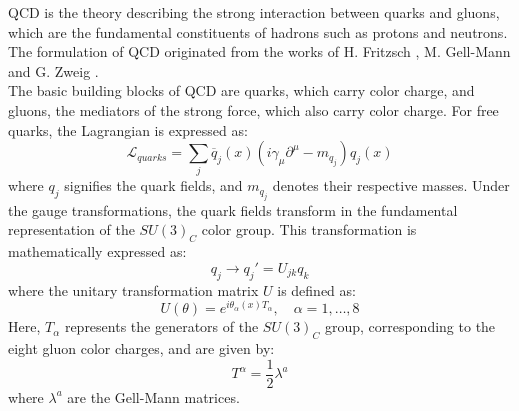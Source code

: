 \noindent QCD is the theory describing the strong interaction between quarks and gluons, which are the fundamental constituents of hadrons such as protons and neutrons. The formulation of QCD originated from the works of H. Fritzsch \cite{Fritzsch:1973pi}, M. Gell-Mann \cite{GM1, GM2} and G. Zweig \cite{Zweig:570209}.\\
The basic building blocks of QCD are quarks, which carry color charge, and gluons, the mediators of the strong force, which also carry color charge. For free quarks, the Lagrangian is expressed as:
\begin{equation}
    \mathscr{L}_{quarks} =\sum_j \overline{q}_j(x)(i\gamma_\mu \partial^\mu - m_{q_j})q_j(x)
\end{equation}
where $q_j$ signifies the quark fields, and $m_{q_j}$ denotes their respective masses. 
Under the gauge transformations, the quark fields transform in the fundamental representation of the $SU(3)_C$ color group. This transformation is mathematically expressed as:
\begin{equation}
    q_j \rightarrow q_j' = U_{jk}q_k
\end{equation}
where the unitary transformation matrix $U$ is defined as:
\begin{equation}
    U(\theta) = e^{i\theta_\alpha(x) T_\alpha}, \quad \alpha = 1, \dots, 8
\end{equation}
Here, $T_{\alpha}$ represents the generators of the $SU(3)_C$ group, corresponding to the eight gluon color charges, and are given by:
\begin{equation}
    T^\alpha = \frac{1}{2}\lambda^a
\end{equation}
where $\lambda^a$ are the Gell-Mann matrices.

